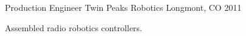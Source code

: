 \begin{cventries}
  \cventry
    {Production Engineer} %
    {Twin Peaks Robotics} %
    {Longmont, CO} %
    {2011} %
    {
      \begin{cvitems} %
        \item {Assembled radio robotics controllers.}
      \end{cvitems}
    }
   
\end{cventries}
